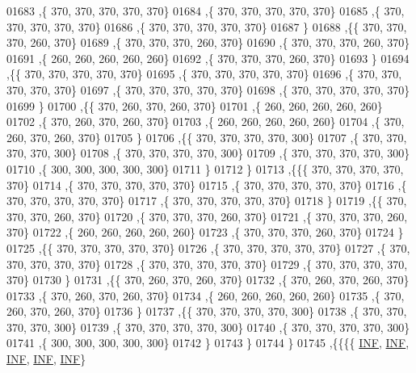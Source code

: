 \begin{DoxyCode}
01683    ,\{   370,   370,   370,   370,   370\}
01684    ,\{   370,   370,   370,   370,   370\}
01685    ,\{   370,   370,   370,   370,   370\}
01686    ,\{   370,   370,   370,   370,   370\}
01687    \}
01688   ,\{\{   370,   370,   370,   260,   370\}
01689    ,\{   370,   370,   370,   260,   370\}
01690    ,\{   370,   370,   370,   260,   370\}
01691    ,\{   260,   260,   260,   260,   260\}
01692    ,\{   370,   370,   370,   260,   370\}
01693    \}
01694   ,\{\{   370,   370,   370,   370,   370\}
01695    ,\{   370,   370,   370,   370,   370\}
01696    ,\{   370,   370,   370,   370,   370\}
01697    ,\{   370,   370,   370,   370,   370\}
01698    ,\{   370,   370,   370,   370,   370\}
01699    \}
01700   ,\{\{   370,   260,   370,   260,   370\}
01701    ,\{   260,   260,   260,   260,   260\}
01702    ,\{   370,   260,   370,   260,   370\}
01703    ,\{   260,   260,   260,   260,   260\}
01704    ,\{   370,   260,   370,   260,   370\}
01705    \}
01706   ,\{\{   370,   370,   370,   370,   300\}
01707    ,\{   370,   370,   370,   370,   300\}
01708    ,\{   370,   370,   370,   370,   300\}
01709    ,\{   370,   370,   370,   370,   300\}
01710    ,\{   300,   300,   300,   300,   300\}
01711    \}
01712   \}
01713  ,\{\{\{   370,   370,   370,   370,   370\}
01714    ,\{   370,   370,   370,   370,   370\}
01715    ,\{   370,   370,   370,   370,   370\}
01716    ,\{   370,   370,   370,   370,   370\}
01717    ,\{   370,   370,   370,   370,   370\}
01718    \}
01719   ,\{\{   370,   370,   370,   260,   370\}
01720    ,\{   370,   370,   370,   260,   370\}
01721    ,\{   370,   370,   370,   260,   370\}
01722    ,\{   260,   260,   260,   260,   260\}
01723    ,\{   370,   370,   370,   260,   370\}
01724    \}
01725   ,\{\{   370,   370,   370,   370,   370\}
01726    ,\{   370,   370,   370,   370,   370\}
01727    ,\{   370,   370,   370,   370,   370\}
01728    ,\{   370,   370,   370,   370,   370\}
01729    ,\{   370,   370,   370,   370,   370\}
01730    \}
01731   ,\{\{   370,   260,   370,   260,   370\}
01732    ,\{   370,   260,   370,   260,   370\}
01733    ,\{   370,   260,   370,   260,   370\}
01734    ,\{   260,   260,   260,   260,   260\}
01735    ,\{   370,   260,   370,   260,   370\}
01736    \}
01737   ,\{\{   370,   370,   370,   370,   300\}
01738    ,\{   370,   370,   370,   370,   300\}
01739    ,\{   370,   370,   370,   370,   300\}
01740    ,\{   370,   370,   370,   370,   300\}
01741    ,\{   300,   300,   300,   300,   300\}
01742    \}
01743   \}
01744  \}
01745 ,\{\{\{\{   \mbox{\hyperlink{1_88_84__epars_8h_a12c2040f25d8e3a7b9e1c2024c618cb6}{INF}},   \mbox{\hyperlink{1_88_84__epars_8h_a12c2040f25d8e3a7b9e1c2024c618cb6}{INF}},   \mbox{\hyperlink{1_88_84__epars_8h_a12c2040f25d8e3a7b9e1c2024c618cb6}{INF}},   \mbox{\hyperlink{1_88_84__epars_8h_a12c2040f25d8e3a7b9e1c2024c618cb6}{INF}},   \mbox{\hyperlink{1_88_84__epars_8h_a12c2040f25d8e3a7b9e1c2024c618cb6}{INF}}\}

\end{DoxyCode}
